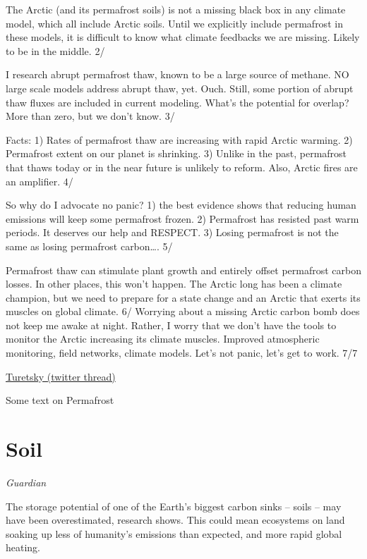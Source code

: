\documentclass[
]{book}
\begin{document}
The Arctic (and its permafrost soils) is not a missing black box in any climate model, which all include Arctic soils. Until we explicitly include permafrost in these models, it is difficult to know what climate feedbacks we are missing. Likely to be in the middle. 2/

I research abrupt permafrost thaw, known to be a large source of methane. NO large scale models address abrupt thaw, yet. Ouch. Still, some portion of abrupt thaw fluxes are included in current modeling. What's the potential for overlap? More than zero, but we don't know. 3/

Facts: 1) Rates of permafrost thaw are increasing with rapid Arctic warming. 2) Permafrost extent on our planet is shrinking. 3) Unlike in the past, permafrost that thaws today or in the near future is unlikely to reform. Also, Arctic fires are an amplifier. 4/

So why do I advocate no panic?
1) the best evidence shows that reducing human emissions will keep some permafrost frozen.
2) Permafrost has resisted past warm periods. It deserves our help and RESPECT.
3) Losing permafrost is not the same as losing permafrost carbon\ldots. 5/

Permafrost thaw can stimulate plant growth and entirely offset permafrost carbon losses. In other places, this won't happen. The Arctic long has been a climate champion, but we need to prepare for a state change and an Arctic that exerts its muscles on global climate. 6/
Worrying about a missing Arctic carbon bomb does not keep me awake at night. Rather, I worry that we don't have the tools to monitor the Arctic increasing its climate muscles. Improved atmospheric monitoring, field networks, climate models. Let's not panic, let's get to work. 7/7

\href{https://twitter.com/queenofpeat/status/1473714739729551365}{Turetsky (twitter thread)}

Some text on Permafrost

\hypertarget{soil}{%
\chapter{Soil}\label{soil}}

\emph{Guardian}

The storage potential of one of the Earth's biggest carbon sinks -- soils -- may have been overestimated, research shows. This could mean ecosystems on land soaking up less of humanity's emissions than expected, and more rapid global heating.
\end{document}
